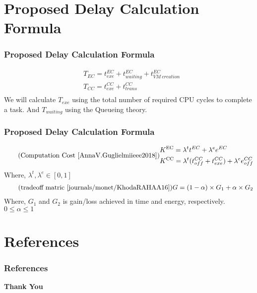 \documentclass[usenames,dvipsnames]{beamer}
\begin{document}
\section{Proposed Delay Calculation Formula}
\begin{frame}
 \frametitle{Proposed Delay Calculation Formula}
 \begin{equation*}
  \begin{aligned}
   & T_{EC}=t^{EC}_{exe}+t^{EC}_{waiting}+t^{EC}_{VM\ creation}\\
   & T_{CC}=t^{CC}_{exe}+t^{CC}_{trans}\\
  \end{aligned}
 \end{equation*}
 We will calculate $T_{exe}$ using the total number of required CPU cycles to complete a task. And $T_{waiting}$ using the Queueing theory.
\end{frame}

\begin{frame}
  \frametitle{Proposed Delay Calculation Formula}
  \begin{equation}
  \tag{Computation Cost \cite{AnnaV.Guglielmiieee2018}}
   \begin{aligned}
 & K\textsuperscript{EC} = \lambda^tt^{EC}+\lambda^ee^{EC}\\
   & K\textsuperscript{CC} = \lambda^t(t^{CC}_{off}+t^{CC}_{exe})+\lambda^ee^{CC}_{off}\\
 \end{aligned}
 \end{equation}
 Where,  $\lambda^t,\lambda^e \in [0,1]$
 \begin{equation*}
 \tag{tradeoff matric \cite{journals/monet/KhodaRAHAA16}}
  \begin{aligned}
   & G = (1- \alpha )\times G_1+\alpha \times G_2\\
  \end{aligned}
 \end{equation*}
 Where, $G_1$ and $G_2$ is gain/loss achieved in time and energy, respectively. $0 \le \alpha \le 1$

\end{frame}

\section{References}
\begin{frame}
  \frametitle{References}
  \printbibliography
% 
\end{frame}

\begin{frame}{\phantom{}}
  \color{Sepia}
  \centering \Huge\textbf{Thank You}
\end{frame}
\end{document}
